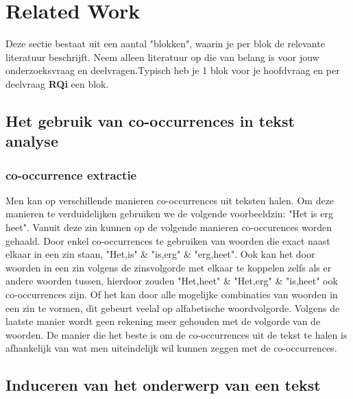 \section{Related Work}
\label{sec:rel}

Deze sectie bestaat uit een aantal "blokken", waarin je per blok de relevante literatuur beschrijft. Neem alleen literatuur op die van belang is voor jouw onderzoeksvraag en deelvragen.Typisch heb je 1 blok voor je hoofdvraag en per deelvraag \textbf{RQi} een blok. 

\subsection{Het gebruik van co-occurrences in tekst analyse}

\subsubsection{co-occurrence extractie}
Men kan op verschillende manieren co-occurrences uit teksten halen. Om deze manieren te verduidelijken gebruiken we de volgende voorbeeldzin: "Het is erg heet". Vanuit deze zin kunnen op de volgende manieren co-occurences worden gehaald. Door enkel co-occurrences te gebruiken van woorden die exact naast elkaar in een zin staan, "Het,is" \& "is,erg" \& "erg,heet". Ook kan het door woorden in een zin volgens de zinsvolgorde met elkaar te koppelen zelfs als er andere woorden tussen, hierdoor zouden "Het,heet" \& "Het,erg" \& "is,heet" ook co-occurrences zijn. Of het kan door alle mogelijke combinaties van woorden in een zin te vormen, dit gebeurt veelal op alfabetische woordvolgorde. Volgens de laatste manier wordt geen rekening meer gehouden met de volgorde van de woorden. De manier die het beste is om de co-occurrences uit de tekst te halen is afhankelijk van wat men uiteindelijk wil kunnen zeggen met de co-occurrences. \citep{shimohata1997retrieving}

\subsection{Induceren van het onderwerp van een tekst}
